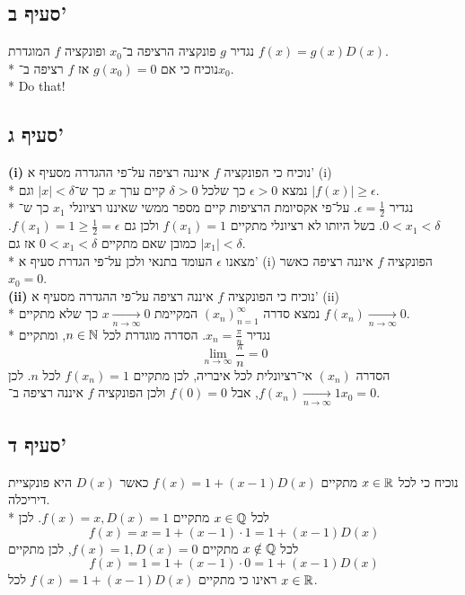 \subsection{סעיף ב'}
נגדיר $g$ פונקציה הרציפה ב־$x_0$ ופונקציה $f$ המוגדרת $f(x) = g(x) D(x)$. \\*
נוכיח כי אם $g(x_0) = 0$ אז $f$ רציפה ב־$x_0$. \\*
Do that!

\subsection{סעיף ג'}
\textbf{(i)}
נוכיח כי הפונקציה $f$ איננה רציפה על־פי ההגדרה מסעיף א' (i) \\*
נמצא $\epsilon > 0$ כך שלכל $\delta > 0$ קיים ערך $x$ כך ש־$|x| < \delta$ וגם $|f(x)| \ge \epsilon$. \\*
נגדיר $\epsilon = \frac{1}{2}$.
על־פי אקסיומת הרציפות קיים מספר ממשי שאיננו רציונלי $x_1$ כך ש־$0 < x_1 < \delta$.
בשל היותו לא רציונלי מתקיים $f(x_1) = 1$ ולכן גם $f(x_1) = 1 \ge \frac{1}{2} = \epsilon$.
כמובן שאם מתקיים $0 < x_1 < \delta$ אז גם $|x_1| < \delta$. \\*
מצאנו $\epsilon$ העומד בתנאי ולכן על־פי הגדרת סעיף א' (i) הפונקציה $f$ איננה רציפה כאשר $x_0 = 0$. \\
\textbf{(ii)}
נוכיח כי הפונקציה $f$ איננה רציפה על־פי ההגדרה מסעיף א' (ii) \\*
נמצא סדרה ${(x_n)}_{n = 1}^\infty$ המקיימת $x \underset{n \to \infty}{\rightarrow} 0$ כך שלא מתקיים $f(x_n) \underset{n \to \infty}{\rightarrow} 0$. \\*
נגדיר $x_n = \frac{\pi}{n}$. הסדרה מוגדרת לכל $n \in \mathbb{N}$, ומתקיים
\[
	\lim_{n \to \infty} \frac{\pi}{n} = 0
\]
הסדרה ${(x_n)}$ אי־רציונלית לכל איבריה, לכן מתקיים $f(x_n) = 1$ לכל $n$.
לכן $f(x_n) \underset{n \to \infty}{\rightarrow} 1$, אבל $f(0) = 0$ ולכן הפונקציה $f$ איננה רציפה ב־$x_0 = 0$.

\subsection{סעיף ד'}
נוכיח כי לכל $x \in \mathbb{R}$ מתקיים $f(x) = 1 + (x - 1)D(x)$ כאשר $D(x)$ היא פונקציית דיריכלה. \\*
לכל $x \in \mathbb{Q}$ מתקיים $f(x) = x, D(x) = 1$. לכן
\[
	f(x) = x = 1 + (x - 1) \cdot 1 = 1 + (x - 1) D(x)
\]
לכל $x \notin \mathbb{Q}$ מתקיים $f(x) = 1, D(x) = 0$, לכן מתקיים
\[
	f(x) = 1 = 1 + (x - 1) \cdot 0 = 1 + (x - 1) D(x)
\]
ראינו כי מתקיים $f(x) = 1 + (x - 1)D(x)$ לכל $x \in \mathbb{R}$.

